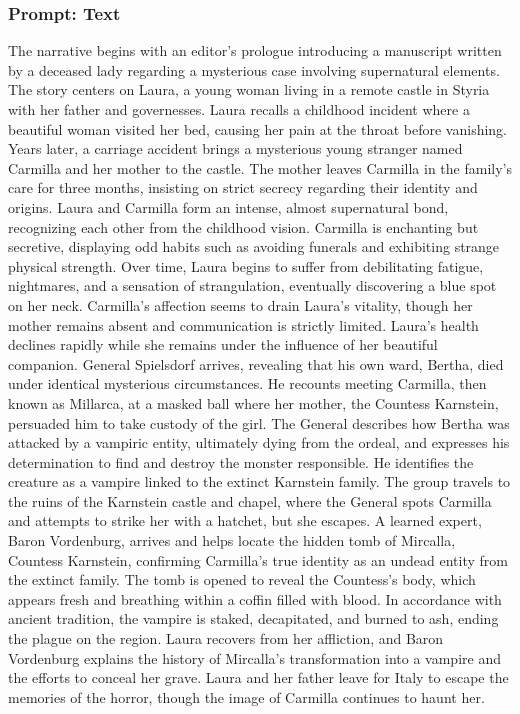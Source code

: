 \documentclass{article} %
\begin{document}
\subsubsection{Prompt: Text}

The narrative begins with an editor's prologue introducing a manuscript written by a deceased lady regarding a mysterious case involving supernatural elements. The story centers on Laura, a young woman living in a remote castle in Styria with her father and governesses. Laura recalls a childhood incident where a beautiful woman visited her bed, causing her pain at the throat before vanishing. Years later, a carriage accident brings a mysterious young stranger named Carmilla and her mother to the castle. The mother leaves Carmilla in the family's care for three months, insisting on strict secrecy regarding their identity and origins. Laura and Carmilla form an intense, almost supernatural bond, recognizing each other from the childhood vision. Carmilla is enchanting but secretive, displaying odd habits such as avoiding funerals and exhibiting strange physical strength. Over time, Laura begins to suffer from debilitating fatigue, nightmares, and a sensation of strangulation, eventually discovering a blue spot on her neck. Carmilla's affection seems to drain Laura's vitality, though her mother remains absent and communication is strictly limited. Laura's health declines rapidly while she remains under the influence of her beautiful companion. General Spielsdorf arrives, revealing that his own ward, Bertha, died under identical mysterious circumstances. He recounts meeting Carmilla, then known as Millarca, at a masked ball where her mother, the Countess Karnstein, persuaded him to take custody of the girl. The General describes how Bertha was attacked by a vampiric entity, ultimately dying from the ordeal, and expresses his determination to find and destroy the monster responsible. He identifies the creature as a vampire linked to the extinct Karnstein family. The group travels to the ruins of the Karnstein castle and chapel, where the General spots Carmilla and attempts to strike her with a hatchet, but she escapes. A learned expert, Baron Vordenburg, arrives and helps locate the hidden tomb of Mircalla, Countess Karnstein, confirming Carmilla's true identity as an undead entity from the extinct family. The tomb is opened to reveal the Countess's body, which appears fresh and breathing within a coffin filled with blood. In accordance with ancient tradition, the vampire is staked, decapitated, and burned to ash, ending the plague on the region. Laura recovers from her affliction, and Baron Vordenburg explains the history of Mircalla's transformation into a vampire and the efforts to conceal her grave. Laura and her father leave for Italy to escape the memories of the horror, though the image of Carmilla continues to haunt her.
\end{document}
